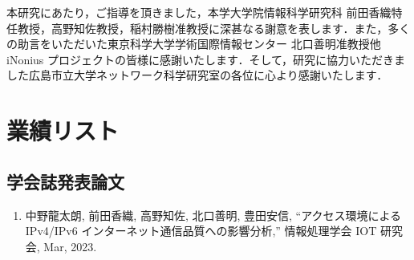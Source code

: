 \documentclass[12pt]{mthesis_utf8}
\begin{document}



\begin{acknowledgment}
本研究にあたり，ご指導を頂きました，本学大学院情報科学研究科 前田香織特任教授，高野知佐教授，稲村勝樹准教授に深甚なる謝意を表します．また，多くの助言をいただいた東京科学大学学術国際情報センター 北口善明准教授他 iNonius プロジェクトの皆様に感謝いたします．そして，研究に協力いただきました広島市立大学ネットワーク科学研究室の各位に心より感謝いたします．
\end{acknowledgment}



\chapter*{業績リスト}

\section*{学会誌発表論文}
\begin{enumerate}
%
\item 中野龍太朗, 前田香織, 高野知佐, 北口善明, 豊田安信, “アクセス環境による IPv4/IPv6 インターネット通信品質への影響分析,” 情報処理学会 IOT 研究会, Mar, 2023.
\end{enumerate}
%
\end{document}
